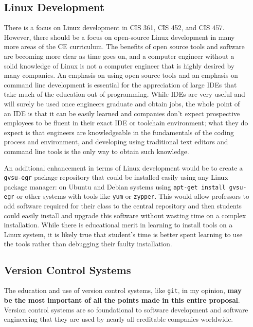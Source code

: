 \documentclass[12pt]{article}
\numberwithin{figure}{section}
\numberwithin{equation}{section}
\begin{document}
{\subsection{Linux Development}\label{linux-development}
There is a focus on Linux development in CIS 361, CIS 452, and CIS 457.
However, there should be a focus on open-source Linux development in
many more areas of the CE curriculum. The benefits of open source tools
and software are becoming more clear as time goes on, and a computer
engineer without a solid knowledge of Linux is not a computer engineer
that is highly desired by many companies. An emphasis on using open
source tools and an emphasis on command line development is essential
for the appreciation of large IDEs that take much of the education out
of programming. While IDEs are very useful and will surely be used once
engineers graduate and obtain jobs, the whole point of an IDE is that it
can be easily learned and companies don't expect prospective employees
to be fluent in their exact IDE or toolchain environment; what they do
expect is that engineers are knowledgeable in the fundamentals of the
coding process and environment, and developing using traditional text
editors and command line tools is the only way to obtain such knowledge.

\bigskip

An additional enhancement in terms of Linux development would be to
create a \texttt{gvsu-egr} package repository that could be installed
easily using any Linux package manager: on Ubuntu and Debian systems
using \texttt{apt-get install gvsu-egr} or other systems with tools like
\texttt{yum} or \texttt{zypper}. This would allow professors to add
software required for their class to the central repository and then
students could easily install and upgrade this software without wasting
time on a complex installation. While there is educational merit in
learning to install tools on a Linux system, it is likely true that
student's time is better spent learning to use the tools rather than
debugging their faulty installation.

\subsection{Version Control Systems}\label{git}
The education and use of version control systems, like \texttt{git}, in
my opinion, \textbf{may be the most important of all the points made in
this entire proposal}. Version control systems are so foundational to
software development and software engineering that they are used by
nearly all creditable companies worldwide.

}
\end{document}
